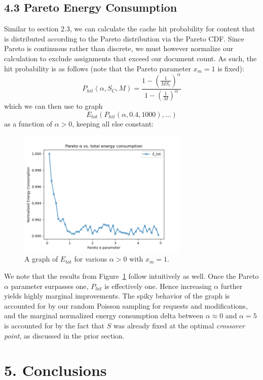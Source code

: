 \documentclass[
	a4paper, %
	10pt, %
	unnumberedsections, %
	twoside, %
]{LTJournalArticle}
\begin{document}
\subsection{4.3 Pareto Energy Consumption}
Similar to section 2.3, we can calculate the cache hit probability for content that is distributed according to the Pareto distribution via the Pareto CDF. Since Pareto is continuous rather than discrete, we must however normalize our calculation to exclude assignments that exceed our document count. As such, the hit probability is as follows (note that the Pareto parameter $x_m=1$ is fixed):
\[ P_{hit}(\alpha, S_C, M) = \frac{1-\left(\frac{1}{MS_c}\right)^\alpha}{1-\left(\frac{1}{M}\right)^\alpha} \]
\noindent which we can then use to graph
\[ E_{tot}\left( P_{hit}(\alpha, 0.4, 1000), \ldots \right)\]
\noindent as a function of $\alpha > 0$, keeping all else constant:

\begin{figure}[h]
	\begin{center}
		\includegraphics[width=8.1cm]{plots/pareto.png}
	\end{center}
	\caption{A graph of $E_{tot}$ for various $\alpha >0$ with $x_m = 1$.}	
        \label{paretoalpha}
\end{figure}

We note that the results from Figure~\ref{paretoalpha} follow intuitively as well. Once the Pareto $\alpha$ parameter surpasses one, $P_{hit}$ is effectively one. Hence increasing $\alpha$ further yields highly marginal improvements. The spiky behavior of the graph is accounted for by our random Poisson sampling for requests and modifications, and the marginal normalized energy consumption delta between $\alpha \approx 0$ and $\alpha =5$ is accounted for by the fact that $S$ was already fixed at the optimal \textit{crossover point}, as discussed in the prior section.

\section{5. Conclusions}
\end{document}
